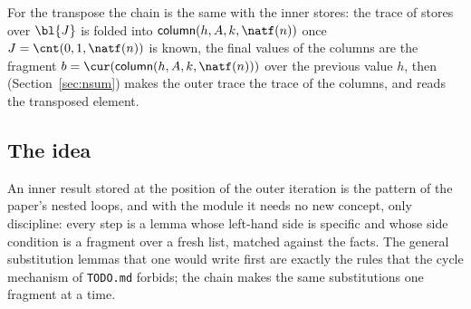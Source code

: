For the transpose the chain is the same with the inner stores: the trace of stores over $\bl{J}$ is folded
into $\mathsf{column}(h, A, k, \natf(n))$ once $J = \cnt(0, 1, \natf(n))$ is known, the final values of the
columns are the fragment $b = \cur(\mathsf{column}(h, A, k, \natf(n)))$ over the previous value $h$, then
 (Section~\ref{sec:nsum}) makes the outer trace the trace of the columns, and
 reads the transposed element.

\subsection{The idea}
An inner result stored at the position of the outer iteration is the pattern of the paper's nested loops,
and with the module it needs no new concept, only discipline: every step is a lemma whose left-hand side is
specific and whose side condition is a fragment over a fresh list, matched against the facts. The general
substitution lemmas that one would write first are exactly the rules that the cycle mechanism of
\texttt{TODO.md} forbids; the chain makes the same substitutions one fragment at a time.
